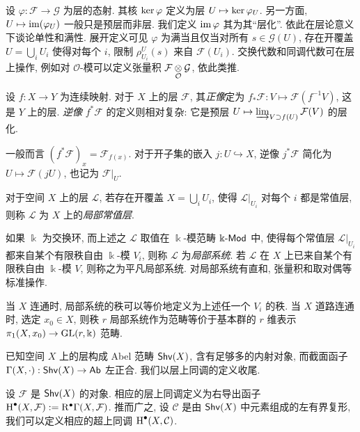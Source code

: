 设 $\varphi: \mathcal{F} \to \mathcal{G}$ 为层的态射. 其核 $\operatorname{ker}\varphi$ 定义为层 $U \mapsto \operatorname{ker} \varphi_U$. 另一方面, $U \mapsto \operatorname{im}(\varphi_U)$ 一般只是预层而非层. 我们定义 $\operatorname{im}\varphi$ 其为其``层化''. 依此在层论意义下谈论单性和满性. 展开定义可见 $\varphi$ 为满当且仅当对所有 $s \in \mathcal{G}(U)$, 存在开覆盖 $U = \bigcup_i U_i$ 使得对每个 $i$, 限制 $\rho^U_{U_i}(s)$ 来自 $\mathcal{F}(U_i)$. 交换代数和同调代数可在层上操作, 例如对 $\mathcal{O}$-模可以定义张量积 $\mathcal{F} \underset{\mathcal{O}}{\otimes} \mathcal{G}$, 依此类推.

设 $f: X \to Y$ 为连续映射. 对于 $X$ 上的层 $\mathcal{F}$, 其\emph{正像}定为 $f_* \mathcal{F}: V \mapsto \mathcal{F}(f^{-1} V)$, 这是 $Y$ 上的层. \emph{逆像} $f^* \mathcal{F}$ 的定义则相对复杂: 它是预层 $U \mapsto \varinjlim_{V \supset f(U)} \mathcal{F}(V)$ 的层化.

一般而言 $(f^* \mathcal{F})_x = \mathcal{F}_{f(x)}$. 对于开子集的嵌入 $j: U \hookrightarrow X$, 逆像 $j^* \mathcal{F}$ 简化为 $U \mapsto \mathcal{F}(jU)$, 也记为 $\mathcal{F}|_U$.

\begin{definition} 
	对于空间 $X$ 上的层 $\mathcal{L}$, 若存在开覆盖 $X = \bigcup_i U_i$, 使得 $\mathcal{L}|_{U_i}$ 对每个 $i$ 都是常值层, 则称 $\mathcal{L}$ 为 $X$ 上的\emph{局部常值层}.
	
	如果 $\Bbbk$ 为交换环, 而上述之 $\mathcal{L}$ 取值在 $\Bbbk$-模范畴 $\Bbbk\text{-}\mathsf{Mod}$ 中, 使得每个常值层 $\mathcal{L}|_{U_i}$ 都来自某个有限秩自由 $\Bbbk$-模 $V_i$, 则称 $\mathcal{L}$ 为\emph{局部系统}. 若 $\mathcal{L}$ 在 $X$ 上已来自某个有限秩自由 $\Bbbk$-模 $V$, 则称之为平凡局部系统. 对局部系统有直和, 张量积和取对偶等标准操作.
\end{definition}

当 $X$ 连通时, 局部系统的秩可以等价地定义为上述任一个 $V_i$ 的秩. 当 $X$ 道路连通时, 选定 $x_0 \in X$, 则秩 $r$ 局部系统作为范畴等价于基本群的 $r$ 维表示 $\pi_1(X, x_0) \to \operatorname{GL}(r, \Bbbk)$ 范畴.

已知空间 $X$ 上的层构成 Abel 范畴 $\mathsf{Shv}(X)$, 含有足够多的内射对象, 而截面函子 $\Gamma(X, \cdot): \mathsf{Shv}(X) \to \mathsf{Ab}$ 左正合. 我们以层上同调的定义收尾. 

\begin{definition}
	设 $\mathcal{F}$ 是 $\mathsf{Shv}(X)$ 的对象. 相应的层上同调定义为右导出函子 $\operatorname{H}^\bullet(X, \mathcal{F}) := \mathrm{R}^\bullet \Gamma(X, \mathcal{F})$. 推而广之, 设 $\mathcal{C}$ 是由 $\mathsf{Shv}(X)$ 中元素组成的左有界复形, 我们可以定义相应的超上同调 $\operatorname{H}^\bullet(X, \mathcal{C})$.
\end{definition}

